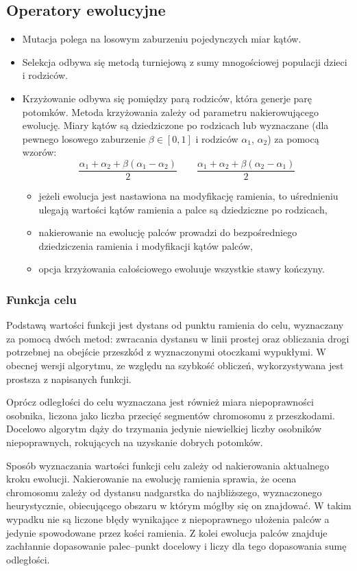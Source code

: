 \documentclass[11pt, leqno]{article}
\begin{document}
\subsection{Operatory ewolucyjne}

\begin{itemize}
	\item Mutacja polega na losowym zaburzeniu pojedynczych miar kątów.
	\item Selekcja odbywa się metodą turniejową z sumy mnogościowej populacji dzieci i rodziców.
	\item Krzyżowanie odbywa się pomiędzy parą rodziców, która generje parę potomków. Metoda krzyżowania zależy od parametru nakierowującego ewolucję. Miary kątów są dziedziczone po rodzicach lub wyznaczane (dla pewnego losowego zaburzenie $\beta\in[0, 1]$ i rodziców $\alpha_1$, $\alpha_2$) za pomocą wzorów:
	\[
		\frac{\alpha_1 + \alpha_2 + \beta(\alpha_1 - \alpha_2)}{2} \quad\quad \frac{\alpha_1 + \alpha_2 + \beta(\alpha_2 - \alpha_1)}{2}
	\]
	\begin{itemize}
		\item jeżeli ewolucja jest nastawiona na modyfikację ramienia, to uśrednieniu ulegają wartości kątów ramienia a palce są dziedziczne po rodzicach,
		\item nakierowanie na ewolucję palców prowadzi do bezpośredniego dziedziczenia ramienia i modyfikacji kątów palców,
		\item opcja krzyżowania całościowego ewoluuje wszystkie stawy kończyny.
	\end{itemize}
\end{itemize}

\subsubsection{Funkcja celu}
Podstawą wartości funkcji jest dystans od punktu ramienia do celu, wyznaczany za pomocą dwóch metod: zwracania dystansu w linii prostej oraz obliczania drogi potrzebnej na obejście przeszkód z wyznaczonymi otoczkami wypukłymi. W obecnej wersji algorytmu, ze względu na szybkość obliczeń, wykorzystywana jest prostsza z napisanych funkcji.

Oprócz odległości do celu wyznaczana jest również miara niepoprawności osobnika, liczona jako liczba przecięć segmentów chromosomu z przeszkodami. Docelowo algorytm dąży do trzymania jedynie niewielkiej liczby osobników niepoprawnych, rokujących na uzyskanie dobrych potomków.

Sposób wyznaczania wartości funkcji celu zależy od nakierowania aktualnego kroku ewolucji. Nakierowanie na ewolucję ramienia sprawia, że ocena chromosomu zależy od dystansu nadgarstka do najbliższego, wyznaczonego heurystycznie, obiecującego obszaru w którym mógłby się on znajdować. W takim wypadku nie są liczone błędy wynikające z niepoprawnego ułożenia palców a jedynie spowodowane przez kości ramienia. Z kolei ewolucja palców znajduje zachłannie dopasowanie palec--punkt docelowy i liczy dla tego dopasowania sumę odległości.
\end{document}

